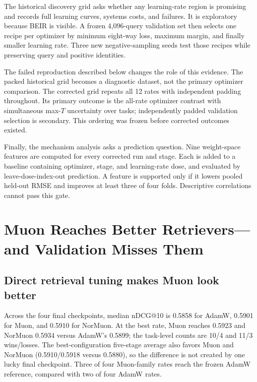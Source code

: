 \documentclass[11pt]{article}
\begin{document}
The historical discovery grid asks whether any learning-rate region is promising and records full
learning curves, systems costs, and failures. It is exploratory because BEIR is visible. A frozen
4,096-query validation set then selects one recipe per optimizer by minimum eight-way loss, maximum
margin, and finally smaller learning rate. Three new negative-sampling seeds test those recipes while
preserving query and positive identities.

The failed reproduction described below changes the role of this evidence. The packed historical
grid becomes a diagnostic dataset, not the primary optimizer comparison. The corrected grid repeats
all 12 rates with independent padding throughout. Its primary outcome is the all-rate optimizer
contrast with simultaneous max-$T$ uncertainty over tasks; independently padded validation
selection is secondary. This ordering was frozen before corrected outcomes existed.

Finally, the mechanism analysis asks a prediction question. Nine weight-space features are computed
for every corrected run and stage. Each is added to a baseline containing optimizer, stage, and
learning-rate dose, and evaluated by leave-dose-index-out prediction. A feature is supported only if
it lowers pooled held-out RMSE and improves at least three of four folds. Descriptive correlations
cannot pass this gate.

\section{Muon Reaches Better Retrievers---and Validation Misses Them}

\subsection{Direct retrieval tuning makes Muon look better}

\DiscoveryHeadline



Across the four final checkpoints, median nDCG@10 is 0.5858 for AdamW, 0.5901 for Muon, and 0.5910
for NorMuon. At the best rate, Muon reaches 0.5923 and NorMuon 0.5934 versus AdamW's 0.5899;
the task-level counts are 10/4 and 11/3 wins/losses. The best-configuration five-stage average also
favors Muon and NorMuon (0.5910/0.5918 versus 0.5880), so the difference is not created by one lucky
final checkpoint. Three of four Muon-family rates reach the frozen AdamW reference, compared with
two of four AdamW rates.
\end{document}
